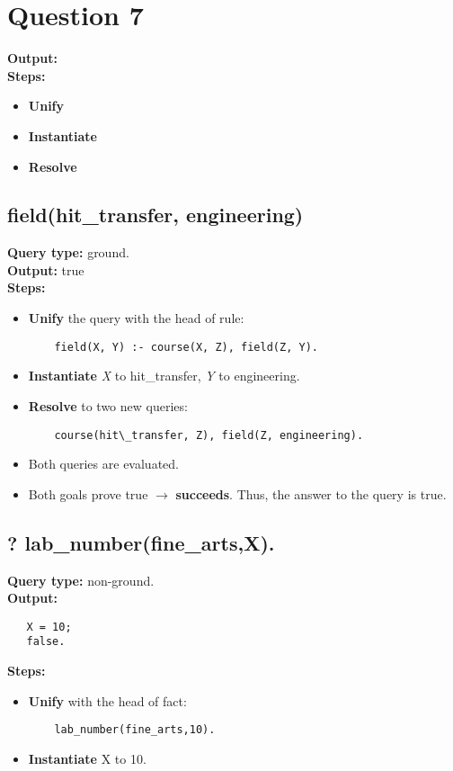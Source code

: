 \newpage
\section{Question 7}
\textbf{Output:} \\
\textbf{Steps:}
\begin{itemize}
    \item \textbf{Unify}
    \item \textbf{Instantiate}
    \item \textbf{Resolve}
\end{itemize}

\subsection{field(hit\_transfer, engineering)}
\textbf{Query type: } ground. \\
\textbf{Output:} true \\
\textbf{Steps:}
\begin{itemize}
    \item \textbf{Unify} the query with the head of rule:
    \begin{lstlisting}
    field(X, Y) :- course(X, Z), field(Z, Y).
    \end{lstlisting}
    \item \textbf{Instantiate} \textit{X} to hit\_transfer, \textit{Y} to engineering.
    \item \textbf{Resolve} to two new queries:
    \begin{lstlisting}
    course(hit\_transfer, Z), field(Z, engineering).
    \end{lstlisting}
\item Both queries are evaluated. 
\item Both goals prove true $\to $ \textbf{succeeds}. Thus, the answer to the query is true. 
\end{itemize}

\subsection{? lab\_number(fine\_arts,X).}
\textbf{Query type: } non-ground. \\
\textbf{Output:} 
\begin{lstlisting}
   X = 10;
   false.
\end{lstlisting}

\textbf{Steps:} 
\begin{itemize}
    \item \textbf{Unify} with the head of fact:
    \begin{lstlisting}
    lab_number(fine_arts,10).
    \end{lstlisting}
\item \textbf{Instantiate} X to 10.
\end{itemize}


